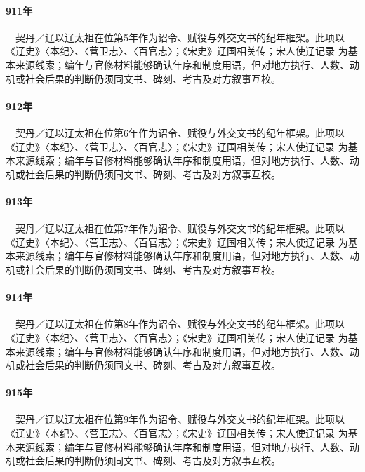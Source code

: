 \paragraph{911年}　契丹／辽以辽太祖在位第5年作为诏令、赋役与外交文书的纪年框架。此项以《辽史》〈本纪〉、〈营卫志〉、〈百官志〉；《宋史》辽国相关传；宋人使辽记录 为基本来源线索；编年与官修材料能够确认年序和制度用语，但对地方执行、人数、动机或社会后果的判断仍须同文书、碑刻、考古及对方叙事互校。

\paragraph{912年}　契丹／辽以辽太祖在位第6年作为诏令、赋役与外交文书的纪年框架。此项以《辽史》〈本纪〉、〈营卫志〉、〈百官志〉；《宋史》辽国相关传；宋人使辽记录 为基本来源线索；编年与官修材料能够确认年序和制度用语，但对地方执行、人数、动机或社会后果的判断仍须同文书、碑刻、考古及对方叙事互校。

\paragraph{913年}　契丹／辽以辽太祖在位第7年作为诏令、赋役与外交文书的纪年框架。此项以《辽史》〈本纪〉、〈营卫志〉、〈百官志〉；《宋史》辽国相关传；宋人使辽记录 为基本来源线索；编年与官修材料能够确认年序和制度用语，但对地方执行、人数、动机或社会后果的判断仍须同文书、碑刻、考古及对方叙事互校。

\paragraph{914年}　契丹／辽以辽太祖在位第8年作为诏令、赋役与外交文书的纪年框架。此项以《辽史》〈本纪〉、〈营卫志〉、〈百官志〉；《宋史》辽国相关传；宋人使辽记录 为基本来源线索；编年与官修材料能够确认年序和制度用语，但对地方执行、人数、动机或社会后果的判断仍须同文书、碑刻、考古及对方叙事互校。

\paragraph{915年}　契丹／辽以辽太祖在位第9年作为诏令、赋役与外交文书的纪年框架。此项以《辽史》〈本纪〉、〈营卫志〉、〈百官志〉；《宋史》辽国相关传；宋人使辽记录 为基本来源线索；编年与官修材料能够确认年序和制度用语，但对地方执行、人数、动机或社会后果的判断仍须同文书、碑刻、考古及对方叙事互校。


